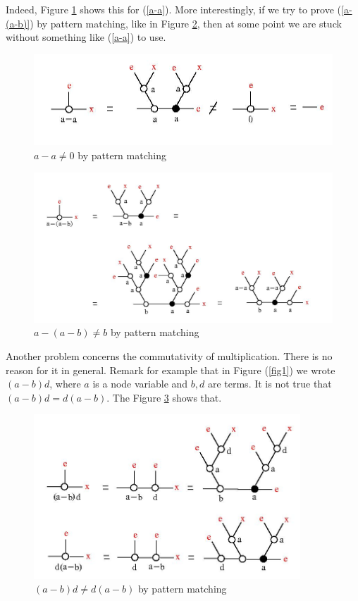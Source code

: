 Indeed, Figure \ref{a-a-fig} shows this for (\ref{a-a}).  More interestingly, if we try to prove (\ref{a-(a-b)}) by pattern matching, like in Figure \ref{a-(a-b)-fig}, then at some point we are stuck without something like (\ref{a-a}) to use. 

\begin{figure}[h]\centerline{\includegraphics[width=120mm]{jpg/a-a.jpg}}  \caption{ $a-a \not = 0$ by pattern matching } \label{a-a-fig}  
\end{figure}

\begin{figure}[h]\includegraphics[width=120mm]{jpg/a-a-b.jpg}  \caption{ $a-(a-b) \not = b$ by pattern matching } \label{a-(a-b)-fig} \end{figure}




Another problem concerns the commutativity of multiplication. There is no reason for it in general. Remark for example that in Figure (\ref{fig1}) we wrote $(a-b)d$, where $a$ is a node variable and $b, d$ are terms. It is not true that $(a-b)d = d(a-b)$. The Figure \ref{a-bd-fig} shows that. 
\begin{figure}[h]\centerline{\includegraphics[width=100mm]{jpg/a-bd.jpg}}
\caption{ $(a-b)d \not = d(a-b)$ by pattern matching} \label{a-bd-fig} 
\end{figure}


